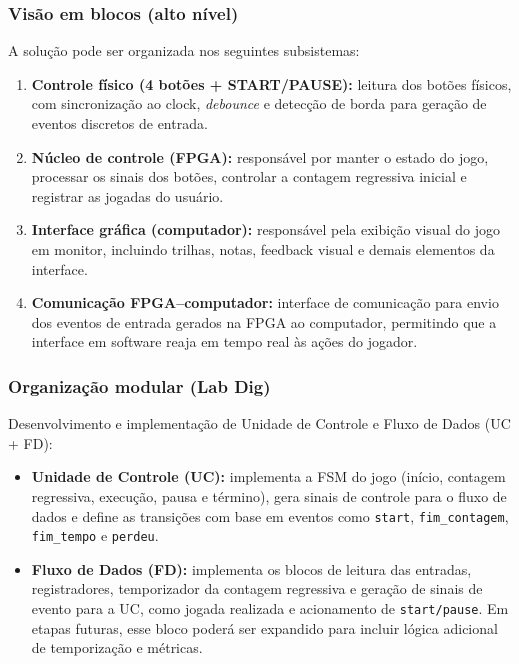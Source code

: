 \documentclass[a4paper,12pt,twoside]{article}
\begin{document}
\subsubsection{Visão em blocos (alto nível)}
A solução pode ser organizada nos seguintes subsistemas:

\begin{enumerate}
    \item \textbf{Controle físico (4 botões + START/PAUSE):} leitura dos botões físicos, com sincronização ao clock, \emph{debounce} e detecção de borda para geração de eventos discretos de entrada.
    \item \textbf{Núcleo de controle (FPGA):} responsável por manter o estado do jogo, processar os sinais dos botões, controlar a contagem regressiva inicial e registrar as jogadas do usuário.
    \item \textbf{Interface gráfica (computador):} responsável pela exibição visual do jogo em monitor, incluindo trilhas, notas, feedback visual e demais elementos da interface.
    \item \textbf{Comunicação FPGA--computador:} interface de comunicação para envio dos eventos de entrada gerados na FPGA ao computador, permitindo que a interface em software reaja em tempo real às ações do jogador.
\end{enumerate}

\subsubsection{Organização modular (Lab Dig)}
Desenvolvimento e implementação de Unidade de Controle e Fluxo de Dados (UC + FD):

\begin{itemize}
    \item \textbf{Unidade de Controle (UC):} implementa a FSM do jogo (início, contagem regressiva, execução, pausa e término), gera sinais de controle para o fluxo de dados e define as transições com base em eventos como \texttt{start}, \texttt{fim\_contagem}, \texttt{fim\_tempo} e \texttt{perdeu}.
    \item \textbf{Fluxo de Dados (FD):} implementa os blocos de leitura das entradas, registradores, temporizador da contagem regressiva e geração de sinais de evento para a UC, como jogada realizada e acionamento de \texttt{start/pause}. Em etapas futuras, esse bloco poderá ser expandido para incluir lógica adicional de temporização e métricas.
\end{itemize}
\end{document}
